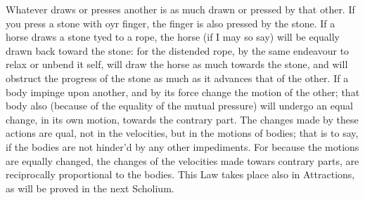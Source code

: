 \begin{itemize}
      Whatever draws or presses another is as much drawn or pressed by that
      other. If you press a stone with oyr finger, the finger is also pressed by
      the stone. If a horse draws a stone tyed to a rope, the horse (if I may so
      say) will be equally drawn back toward the stone: for the distended rope,
      by the same endeavour to relax or unbend it self, will draw the horse as
      much towards the stone, and will obstruct the progress of the stone as
      much as it advances that of the other. If a body impinge upon another, and
      by its force change the motion of the other; that body also (because of
      the equality of the mutual pressure) will undergo an equal change, in its
      own motion, towards the contrary part. The changes made by these actions
      are qual, not in the velocities, but in the motions of bodies; that is to
      say, if the bodies are not hinder'd by any other impediments. For because
      the motions are equally changed, the changes of the velocities made towars
      contrary parts, are reciprocally proportional to the bodies. This Law
      takes place also in Attractions, as will be proved in the next Scholium.
\end{itemize}
%
%
%
